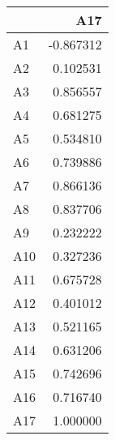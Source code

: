 \begin{tabular}{lr}
\toprule
{} &       A17 \\
\midrule
A1  & -0.867312 \\
A2  &  0.102531 \\
A3  &  0.856557 \\
A4  &  0.681275 \\
A5  &  0.534810 \\
A6  &  0.739886 \\
A7  &  0.866136 \\
A8  &  0.837706 \\
A9  &  0.232222 \\
A10 &  0.327236 \\
A11 &  0.675728 \\
A12 &  0.401012 \\
A13 &  0.521165 \\
A14 &  0.631206 \\
A15 &  0.742696 \\
A16 &  0.716740 \\
A17 &  1.000000 \\
\bottomrule
\end{tabular}
